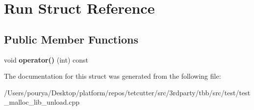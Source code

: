 \hypertarget{structRun}{}\section{Run Struct Reference}
\label{structRun}
\subsection*{Public Member Functions}
\begin{DoxyCompactItemize}
\item 
\hypertarget{structRun_aa78fd951de9109157e7b7f3f2fd43428}{}void {\bfseries operator()} (int) const \label{structRun_aa78fd951de9109157e7b7f3f2fd43428}

\end{DoxyCompactItemize}


The documentation for this struct was generated from the following file\+:\begin{DoxyCompactItemize}
\item 
/\+Users/pourya/\+Desktop/platform/repos/tetcutter/src/3rdparty/tbb/src/test/test\+\_\+malloc\+\_\+lib\+\_\+unload.\+cpp\end{DoxyCompactItemize}
